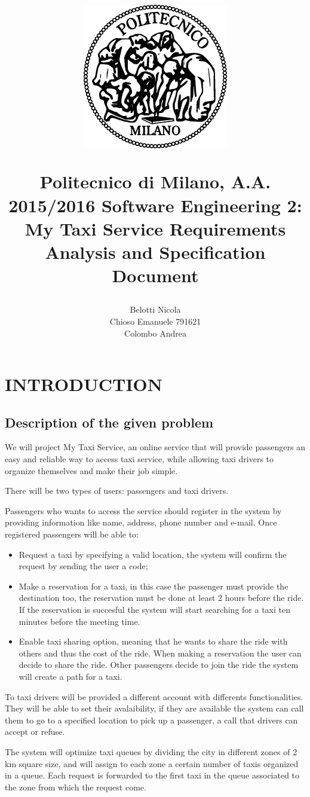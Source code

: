 \documentclass[a4paper, 12pt, titlepage]{article}
\title{
	\begin{figure}[h]
		\centering
		\includegraphics{polimi_logo}
	\end{figure}
	Politecnico di Milano, A.A. 2015/2016 
	\newline\newline 
	Software Engineering 2: My Taxi Service 
	\textbf{R}equirements \textbf{A}nalysis and \textbf{S}pecification \textbf{D}ocument}
\author{Belotti Nicola\\ Chioso Emanuele 791621\\ Colombo Andrea}
\begin{document}
\maketitle
\tableofcontents
\newpage

\section{INTRODUCTION}
\subsection{Description of the given problem}

We will project My Taxi Service, an online service that will provide passengers an easy and reliable way to access taxi service, while allowing taxi drivers to organize themselves and make their job simple.

There will be two types of users: passengers and taxi drivers.

Passengers who wants to access the service should register in the system by providing information like name, address, phone number and e-mail. 
Once registered passengers will be able to: 
\begin{itemize}
	\item Request a taxi by specifying a valid location, the system will confirm the request by sending the user a code;
	\item Make a reservation for a taxi, in this case the passenger must provide the destination too, the reservation must be done at least 2 hours before the ride. If the reservation is succesful the system will start searching for a taxi ten minutes before the meeting time.
	\item Enable taxi sharing option, meaning that he wants to share the ride with others and thus the cost of the ride. When making a reservation the user can decide to share the ride. Other passengers decide to join the ride the system will create a path for a taxi.
\end{itemize}

To taxi drivers will be provided a different account with differents functionalities. They will be able to set their avalaibility, if they are available the system can call them to go to a specified location to pick up a passenger, a call that drivers can accept or refuse.

The system will optimize taxi queues by dividing the city in different zones of 2 km square size, and will assign to each zone a certain number of taxis organized in a queue. Each request is forwarded to the first taxi in the queue associated to the zone from which the request come.
\end{document}
